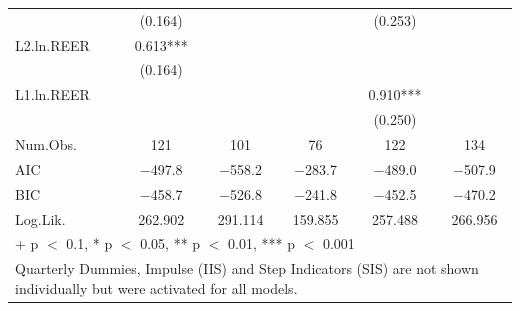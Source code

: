 \begin{table}
{\begin{tabular}[t]{lccccc}
 & (\num{0.164}) &  &  & (\num{0.253}) & \\
L2.ln.REER & \num{0.613}*** &  &  &  & \\
 & (\num{0.164}) &  &  &  & \\
L1.ln.REER &  &  &  & \num{0.910}*** & \\
 &  &  &  & (\num{0.250}) & \\
\midrule
Num.Obs. & \num{121} & \num{101} & \num{76} & \num{122} & \num{134}\\
AIC & \num{-497.8} & \num{-558.2} & \num{-283.7} & \num{-489.0} & \num{-507.9}\\
BIC & \num{-458.7} & \num{-526.8} & \num{-241.8} & \num{-452.5} & \num{-470.2}\\
Log.Lik. & \num{262.902} & \num{291.114} & \num{159.855} & \num{257.488} & \num{266.956}\\
\bottomrule
\multicolumn{6}{l}{\rule{0pt}{1em}+ p $<$ 0.1, * p $<$ 0.05, ** p $<$ 0.01, *** p $<$ 0.001}\\
\multicolumn{6}{l}{\rule{0pt}{1em}Quarterly Dummies, Impulse (IIS) and Step Indicators (SIS) are not shown individually but were activated for all models.}\\
\end{tabular}}
\end{table}
